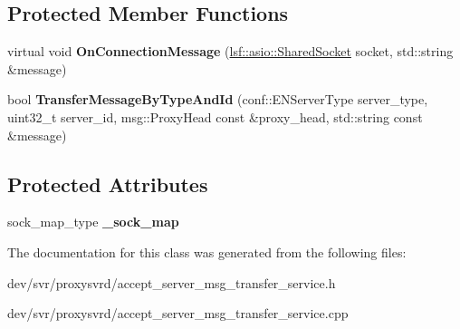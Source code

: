 \subsection*{Protected Member Functions}
\begin{DoxyCompactItemize}
\item 
\hypertarget{classAcceptServerMsgTransferService_af3a10bb242f42adc4038891766475e76}{
virtual void {\bfseries OnConnectionMessage} (\hyperlink{classlsf_1_1asio_1_1SharedSocket}{lsf::asio::SharedSocket} socket, std::string \&message)}
\label{classAcceptServerMsgTransferService_af3a10bb242f42adc4038891766475e76}

\item 
\hypertarget{classAcceptServerMsgTransferService_ac291271cdab011bfa4b51761b00effdc}{
bool {\bfseries TransferMessageByTypeAndId} (conf::ENServerType server\_\-type, uint32\_\-t server\_\-id, msg::ProxyHead const \&proxy\_\-head, std::string const \&message)}
\label{classAcceptServerMsgTransferService_ac291271cdab011bfa4b51761b00effdc}

\end{DoxyCompactItemize}
\subsection*{Protected Attributes}
\begin{DoxyCompactItemize}
\item 
\hypertarget{classAcceptServerMsgTransferService_a45a11e5aec1f81ae8e94e20bb5166418}{
sock\_\-map\_\-type {\bfseries \_\-sock\_\-map}}
\label{classAcceptServerMsgTransferService_a45a11e5aec1f81ae8e94e20bb5166418}

\end{DoxyCompactItemize}


The documentation for this class was generated from the following files:\begin{DoxyCompactItemize}
\item 
dev/svr/proxysvrd/accept\_\-server\_\-msg\_\-transfer\_\-service.h\item 
dev/svr/proxysvrd/accept\_\-server\_\-msg\_\-transfer\_\-service.cpp\end{DoxyCompactItemize}
